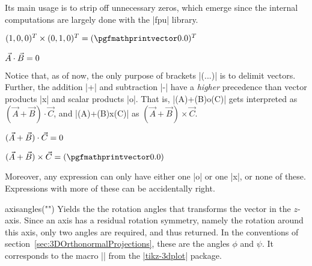 \documentclass[a4paper,fleqn]{ltxdoc}
\begin{document}
Its main usage is to strip off unnecessary zeros, which emerge since the
internal computations are largely done with the |fpu| library.

\begin{codeexample}[width=5.2cm,preamble={\usetikzlibrary{3dtools}}]
%
$(1,0,0)^T\times(0,1,0)^T=
(\pgfmathprintvector\pgfmathresult)^T$
\end{codeexample}

\begin{codeexample}[width=5.2cm,preamble={\usetikzlibrary{3dtools}}]
%
$\vec A\cdot \vec B=
\pgfmathprintnumber\pgfmathresult$
\end{codeexample}

Notice that, as of now, the only purpose of brackets |(...)| is to delimit
vectors. Further, the addition |+| and subtraction |-| have a \emph{higher}
precedence than vector products |x| and scalar products |o|. That is,
|(A)+(B)o(C)| gets interpreted as $(\vec A+\vec B)\cdot\vec C$, and
|(A)+(B)x(C)| as $(\vec A+\vec B)\times\vec C$.



\begin{codeexample}[width=5.2cm,preamble={\usetikzlibrary{3dtools}}]
%
$(\vec A+\vec B)\cdot\vec C=
\pgfmathprintnumber\pgfmathresult$
\end{codeexample}

\begin{codeexample}[width=5.2cm,preamble={\usetikzlibrary{3dtools}}]
%
$(\vec A+\vec B)\times\vec C=
(\pgfmathprintvector\pgfmathresult)$
\end{codeexample}

Moreover, any expression can only have either one |o| or one |x|, or none of
these. Expressions with more of these can be accidentally right.

\begin{math-function}{axisangles("")}
   Yields the the rotation angles that transforms the vector in the $z$-axis.
   Since an axis has a residual rotation symmetry, namely the rotation around
   this axis, only two angles are required, and thus returned. In the
   conventions of section~\ref{sec:3DOrthonormalProjections}, these are the
   angles $\phi$ and $\psi$. It corresponds to the macro
   |\tdplotgetpolarcoords| from the 
   \href{https://ctan.org/pkg/tikz-3dplot?lang=en}{|tikz-3dplot|} package.
\end{math-function}
\end{document}
